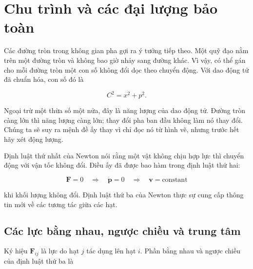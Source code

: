\begin{classroomqa}
\end{classroomqa}

\section{Chu trình và các đại lượng bảo toàn}

Các đường tròn trong không gian pha gợi ra ý tưởng tiếp theo. Một quỹ đạo nằm trên một đường tròn và không bao giờ nhảy sang đường khác. Vì vậy, có thể gán cho mỗi đường tròn một con số không đổi dọc theo chuyển động. Với dao động tử đã chuẩn hóa, con số đó là

\begin{equation}
  C^2=x^2+p^2.
  \label{eq:cycle-label}
\end{equation}

Ngoại trừ một thừa số một nửa, đây là năng lượng của dao động tử. Đường tròn càng lớn thì năng lượng càng lớn; thay đổi pha ban đầu không làm nó thay đổi. Chúng ta sẽ suy ra mệnh đề ấy thay vì chỉ đọc nó từ hình vẽ, nhưng trước hết hãy xét động lượng.

Định luật thứ nhất của Newton nói rằng một vật không chịu hợp lực thì chuyển động với vận tốc không đổi. Điều ấy đã được bao hàm trong định luật thứ hai:

\begin{equation}
  \mathbf F=0
  \quad\Longrightarrow\quad
  \dot{\mathbf p}=0
  \quad\Longrightarrow\quad
  \mathbf v=\text{constant}
  \label{eq:newton-first-from-second}
\end{equation}

khi khối lượng không đổi. Định luật thứ ba của Newton thực sự cung cấp thông tin mới về các tương tác giữa các hạt.

\subsection{Các lực bằng nhau, ngược chiều và trung tâm}

Ký hiệu \(\mathbf F_{ij}\) là lực do hạt \(j\) tác dụng lên hạt \(i\). Phần bằng nhau và ngược chiều của định luật thứ ba là

